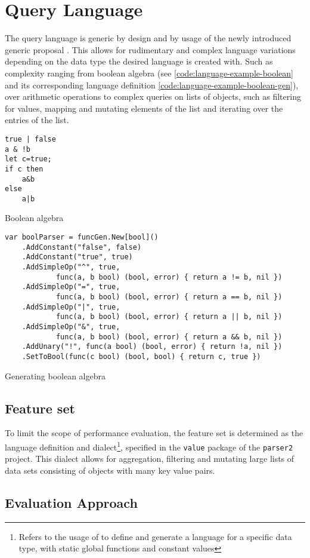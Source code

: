 \chapter{Query Language}

The query language is generic by design and by usage of the newly introduced
generic proposal \cite{go_generic_proposal}. This allows for rudimentary and
complex language variations depending on the data type the desired language is
created with. Such as complexity ranging from boolean algebra (see
\autoref{code:language-example-boolean} and its corresponding language
definition \autoref{code:language-example-boolean-gen}), over arithmetic
operations to complex queries on lists of objects, such as filtering for
values, mapping and mutating elements of the list and iterating over the
entries of the list.

\begin{listing}[H]
    \begin{verbatim}
true | false
a & !b
let c=true;
if c then 
    a&b 
else 
    a|b
    \end{verbatim}
    \caption{Boolean algebra}
    \label{code:language-example-boolean}
\end{listing}

\begin{listing}[H]
    \begin{verbatim}
var boolParser = funcGen.New[bool]()
    .AddConstant("false", false)
    .AddConstant("true", true)
    .AddSimpleOp("^", true, 
            func(a, b bool) (bool, error) { return a != b, nil })
    .AddSimpleOp("=", true, 
            func(a, b bool) (bool, error) { return a == b, nil })
    .AddSimpleOp("|", true, 
            func(a, b bool) (bool, error) { return a || b, nil })
    .AddSimpleOp("&", true, 
            func(a, b bool) (bool, error) { return a && b, nil })
    .AddUnary("!", func(a bool) (bool, error) { return !a, nil })
    .SetToBool(func(c bool) (bool, bool) { return c, true })
    \end{verbatim}
    \caption{Generating boolean algebra}
    \label{code:language-example-boolean-gen}
\end{listing}

\section{Feature set}

To limit the scope of performance evaluation, the feature set is determined as
the  language definition and dialect\footnote{Refers to the usage of
\cite{parser2_xnacly} to define and generate a language for a specific data
type, with static global functions and constant values}, specified in the
\texttt{value} package of the \texttt{parser2} \cite[\texttt{value}
package]{parser2_xnacly} project. This dialect allows for aggregation,
filtering and mutating large lists of data sets consisting of objects with many
key value pairs.


\section{Evaluation Approach}


